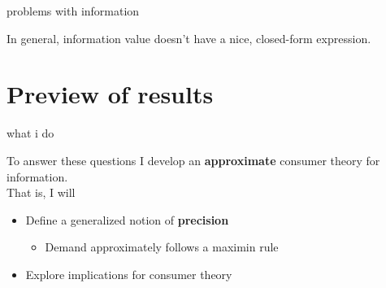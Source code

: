 \documentclass[square,]{gBakerBeamer}
\renewcommand{\|}{\,|\,}
\begin{document}
\begin{frame}{problems with information}

  In general, information value doesn't have a nice, closed-form
  expression.


\end{frame}



\section{Preview of results}
\label{sec:question}


\begin{frame}{what i do}

  To answer these questions I develop an \textbf{approximate} consumer theory for information.\\[1em]

  That is, I will
  \begin{itemize}
    \item<1-> Define a generalized notion of \textbf{precision}
          \begin{itemize}
            \item Demand approximately follows a maximin rule
          \end{itemize}
    \item<2-> Explore implications for consumer theory
  \end{itemize}\bigskip


\end{frame}
\end{document}
